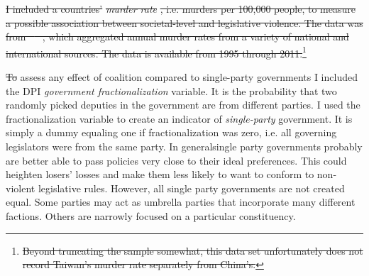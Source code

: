 \documentclass[a4paper]{article}\usepackage[]{graphicx}\usepackage[]{color}
\providecommand{\DIFaddtex}[1]{{\protect\color{blue}\uwave{#1}}} %
\providecommand{\DIFdeltex}[1]{{\protect\color{red}\sout{#1}}}                      %
\providecommand{\DIFaddbegin}{} %
\providecommand{\DIFaddend}{} %
\providecommand{\DIFdelend}{} %
\providecommand{\DIFadd}[1]{\texorpdfstring{\DIFaddtex{#1}}{#1}} %
\providecommand{\DIFdel}[1]{\texorpdfstring{\DIFdeltex{#1}}{}} %
\begin{document}
\DIFdel{I included a countries' }\emph{\DIFdel{murder rate}}%
\DIFdel{, i.e. murders per 100,000 people, to measure a possible association between societal-level and legislative violence. The data was from \mbox{%
\cite{UNMurder2013}
}%
, which aggregated annual murder rates from a variety of national and international sources. The data is available from 1995 through 2011.}\footnote{\DIFdel{Beyond truncating the sample somewhat, this data set unfortunately does not record Taiwan's murder rate separately from China's.}}
\addtocounter{footnote}{-1}%

\DIFdel{To }\DIFdelend assess any effect of coalition compared to single-party governments I included \DIFaddbegin \DIFadd{a transformation of }\DIFaddend the DPI {\emph{government fractionalization}} variable. It is the probability that two randomly picked deputies in the government are from different parties. I used the fractionalization variable to create an indicator of {\emph{single-party}} government. It is simply a dummy equaling one if fractionalization was zero, i.e. all governing legislators were from the same party. In general\DIFaddbegin \DIFadd{, }\DIFaddend single party governments probably are better able to pass policies very close to their ideal preferences. This could heighten losers' losses and make them less likely to want to conform to non-violent legislative rules. However, all single party governments are not created equal. Some parties may act as umbrella parties that incorporate many different factions. Others are narrowly focused on a particular constituency.
\end{document}
